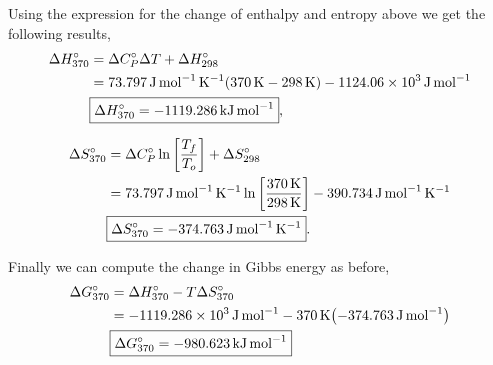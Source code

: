 \documentclass[main.tex]{subfiles}
\begin{document}
Using the expression for the change of enthalpy and entropy above we get the following results,
\begin{align*}
    \Delta H^\circ_{370}&= \Delta C_P^\circ\Delta T + \Delta H^\circ_{298} \\
    &= \SI{73.797}{\joule\per\mole\per\kelvin}\qty(\SI{370}{\kelvin}-\SI{298}{\kelvin}) -\SI{1124.06d3}{\joule\per\mole} \\
    &\boxed{\Delta H^\circ_{370}=-\SI{1119.286}{\kilo\joule\per\mole}},
\end{align*}

\begin{align*}
    \Delta S^\circ_{370}&= \Delta C_P^\circ\ln\qty[\frac{T_f}{T_o}] + \Delta S^\circ_{298} \\
    &= \SI{73.797}{\joule\per\mole\per\kelvin}\ln\qty[\frac{\SI{370}{\kelvin}}{\SI{298}{\kelvin}}] -\SI{390.734}{\joule\per\mole\per\kelvin} \\
    &\boxed{\Delta S^\circ_{370}=-\SI{374.763}{\joule\per\mole\per\kelvin}}.
\end{align*}

Finally we can compute the change in Gibbs energy as before,
\begin{align*}
    \Delta G^\circ_{370} &= \Delta H^\circ_{370} - T\Delta S^\circ_{370} \\
    &= -\SI{1119.286d3}{\joule\per\mole} - \SI{370}{\kelvin}\qty(-\SI{374.763}{\joule\per\mole}) \\
    &\boxed{\Delta G^\circ_{370} = -\SI{980.623}{\kilo\joule\per\mole}}
\end{align*}
\end{document}
